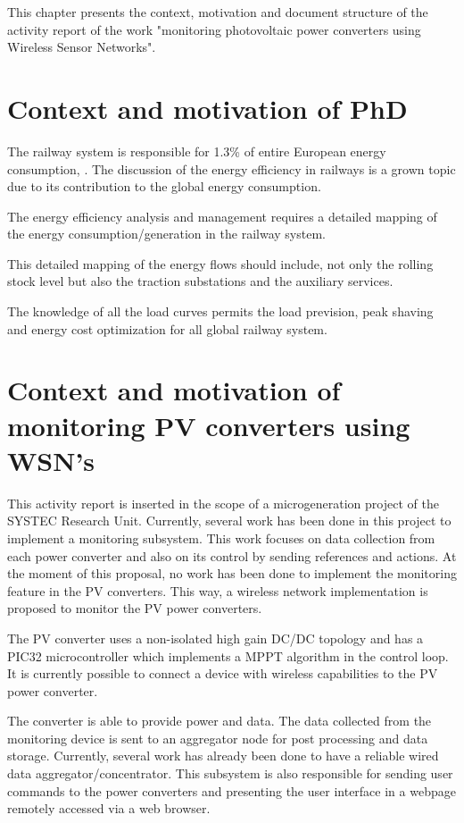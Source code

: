 This chapter presents the context, motivation and document structure of the activity report of the work "monitoring photovoltaic power converters using Wireless Sensor Networks". 

\section{Context and motivation of PhD}

The railway system is responsible for 1.3\% of entire European energy consumption, \cite{iea-uic2016}. 
The discussion of the energy efficiency in railways is a grown topic due to its contribution to the global energy consumption.

The energy efficiency analysis and management requires a detailed mapping of the energy consumption/generation in the railway system. 

This detailed mapping of the energy flows should include, not only the rolling stock level but also the traction substations and the auxiliary services.

The knowledge of all the load curves permits the load prevision, peak shaving and energy cost optimization for all global railway system.

\section{Context and motivation of monitoring PV converters using WSN's}


This activity report is inserted in the scope of a microgeneration project of the SYSTEC Research Unit.
Currently, several work has been done in this project to implement a monitoring subsystem. This work focuses on data collection from each power converter and also on its control by sending references and actions. At the moment of this proposal, no work has been done to implement the monitoring feature in the PV converters. This way, a wireless network implementation is proposed to monitor the PV power converters.

The PV converter uses a non-isolated high gain DC/DC topology and has a PIC32 microcontroller which implements a MPPT algorithm in the control loop. It is currently possible to connect a device with wireless capabilities to the PV power converter. 

The converter is able to provide power and data. The data collected from the monitoring device is sent to an aggregator node for post processing and data storage. Currently, several work has already been done to have a reliable wired data aggregator/concentrator.
This subsystem is also responsible for sending user commands to the power converters and presenting the user interface in a webpage remotely accessed via a web browser. 




